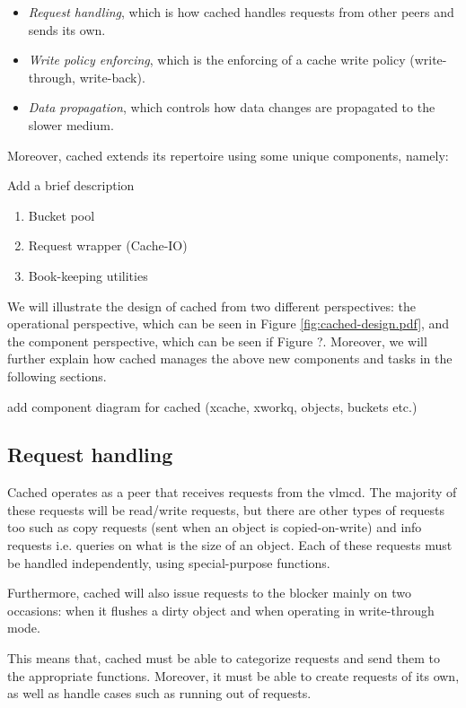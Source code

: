 \begin{itemize}
	\item \textit{Request handling}, which is how cached handles requests 
		from other peers and sends its own.
	\item \textit{Write policy enforcing}, which is the enforcing of a 
		cache write policy (write-through, write-back).
	\item \textit{Data propagation}, which controls how data changes are 
		propagated to the slower medium.
\end{itemize}

Moreover, cached extends its repertoire using some unique components, namely:

\fixme Add a brief description
\begin{enumerate}
	\item Bucket pool
	\item Request wrapper (Cache-IO)
	\item Book-keeping utilities
\end{enumerate}

We will illustrate the design of cached from two different perspectives: the 
operational perspective, which can be seen in Figure 
\ref{fig:cached-design.pdf}, and the component perspective, which can be seen 
if Figure ?. Moreover, we will further explain how cached manages the above new 
components and tasks in the following sections.

\fixme add component diagram for cached (xcache, xworkq, objects, buckets etc.)

\subsection{Request handling}

Cached operates as a peer that receives requests from the vlmcd. The majority of 
these requests will be read/write requests, but there are other types of 
requests too such as copy requests (sent when an object is copied-on-write) and 
info requests i.e. queries on what is the size of an object. Each of these 
requests must be handled independently, using special-purpose functions.

Furthermore, cached will also issue requests to the blocker mainly on two 
occasions: when it flushes a dirty object and when operating in write-through 
mode.

This means that, cached must be able to categorize requests and send them to 
the appropriate functions. Moreover, it must be able to create requests of its 
own, as well as handle cases such as running out of requests.

